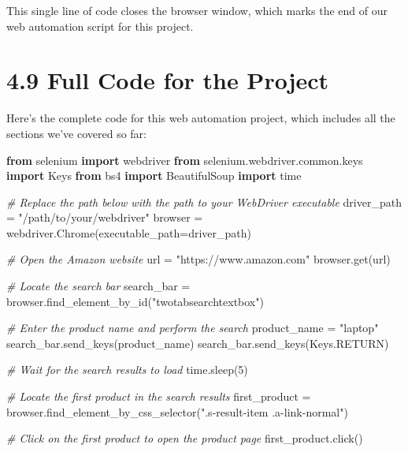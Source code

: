 \documentclass[
  paper=a4,
  ,captions=tableheading
]{scrartcl}
\newenvironment{Shaded}{}{}
\newcommand{\CommentTok}[1]{\textcolor[rgb]{0.38,0.63,0.69}{\textit{#1}}}
\newcommand{\DecValTok}[1]{\textcolor[rgb]{0.25,0.63,0.44}{#1}}
\newcommand{\ImportTok}[1]{\textcolor[rgb]{0.00,0.50,0.00}{\textbf{#1}}}
\newcommand{\NormalTok}[1]{#1}
\newcommand{\OperatorTok}[1]{\textcolor[rgb]{0.40,0.40,0.40}{#1}}
\newcommand{\StringTok}[1]{\textcolor[rgb]{0.25,0.44,0.63}{#1}}
\begin{document}
This single line of code closes the browser window, which marks the end
of our web automation script for this project.

\hypertarget{full-code-for-the-project}{%
\section{4.9 Full Code for the
Project}\label{full-code-for-the-project}}

Here's the complete code for this web automation project, which includes
all the sections we've covered so far:

\begin{Shaded}
\begin{Highlighting}[]
\ImportTok{from}\NormalTok{ selenium }\ImportTok{import}\NormalTok{ webdriver}
\ImportTok{from}\NormalTok{ selenium.webdriver.common.keys }\ImportTok{import}\NormalTok{ Keys}
\ImportTok{from}\NormalTok{ bs4 }\ImportTok{import}\NormalTok{ BeautifulSoup}
\ImportTok{import}\NormalTok{ time}

\CommentTok{\# Replace the path below with the path to your WebDriver executable}
\NormalTok{driver\_path }\OperatorTok{=} \StringTok{"/path/to/your/webdriver"}
\NormalTok{browser }\OperatorTok{=}\NormalTok{ webdriver.Chrome(executable\_path}\OperatorTok{=}\NormalTok{driver\_path)}

\CommentTok{\# Open the Amazon website}
\NormalTok{url }\OperatorTok{=} \StringTok{"https://www.amazon.com"}
\NormalTok{browser.get(url)}

\CommentTok{\# Locate the search bar}
\NormalTok{search\_bar }\OperatorTok{=}\NormalTok{ browser.find\_element\_by\_id(}\StringTok{"twotabsearchtextbox"}\NormalTok{)}

\CommentTok{\# Enter the product name and perform the search}
\NormalTok{product\_name }\OperatorTok{=} \StringTok{"laptop"}
\NormalTok{search\_bar.send\_keys(product\_name)}
\NormalTok{search\_bar.send\_keys(Keys.RETURN)}

\CommentTok{\# Wait for the search results to load}
\NormalTok{time.sleep(}\DecValTok{5}\NormalTok{)}

\CommentTok{\# Locate the first product in the search results}
\NormalTok{first\_product }\OperatorTok{=}\NormalTok{ browser.find\_element\_by\_css\_selector(}\StringTok{".s{-}result{-}item .a{-}link{-}normal"}\NormalTok{)}

\CommentTok{\# Click on the first product to open the product page}
\NormalTok{first\_product.click()}


\end{Highlighting}
\end{Shaded}
\end{document}
